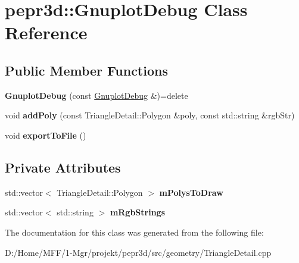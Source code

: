 \hypertarget{classpepr3d_1_1_gnuplot_debug}{}\section{pepr3d\+::Gnuplot\+Debug Class Reference}
\label{classpepr3d_1_1_gnuplot_debug}
\subsection*{Public Member Functions}
\begin{DoxyCompactItemize}
\item 
\mbox{\label{classpepr3d_1_1_gnuplot_debug_a6509512f1eed035a09cd6c4c5050c01f}} 
{\bfseries Gnuplot\+Debug} (const \mbox{\hyperlink{classpepr3d_1_1_gnuplot_debug}{Gnuplot\+Debug}} \&)=delete
\item 
\mbox{\label{classpepr3d_1_1_gnuplot_debug_aa1e77746ecbdd8b88584da18cdc4575e}} 
void {\bfseries add\+Poly} (const Triangle\+Detail\+::\+Polygon \&poly, const std\+::string \&rgb\+Str)
\item 
\mbox{\label{classpepr3d_1_1_gnuplot_debug_a24feefb576434a6f78519897900478a2}} 
void {\bfseries export\+To\+File} ()
\end{DoxyCompactItemize}
\subsection*{Private Attributes}
\begin{DoxyCompactItemize}
\item 
\mbox{\label{classpepr3d_1_1_gnuplot_debug_a42d5570c79096af28d06053f4258fdcc}} 
std\+::vector$<$ Triangle\+Detail\+::\+Polygon $>$ {\bfseries m\+Polys\+To\+Draw}
\item 
\mbox{\label{classpepr3d_1_1_gnuplot_debug_a50b7db306f3168b2a549b8217d18fc34}} 
std\+::vector$<$ std\+::string $>$ {\bfseries m\+Rgb\+Strings}
\end{DoxyCompactItemize}


The documentation for this class was generated from the following file\+:\begin{DoxyCompactItemize}
\item 
D\+:/\+Home/\+M\+F\+F/1-\/\+Mgr/projekt/pepr3d/src/geometry/Triangle\+Detail.\+cpp\end{DoxyCompactItemize}
